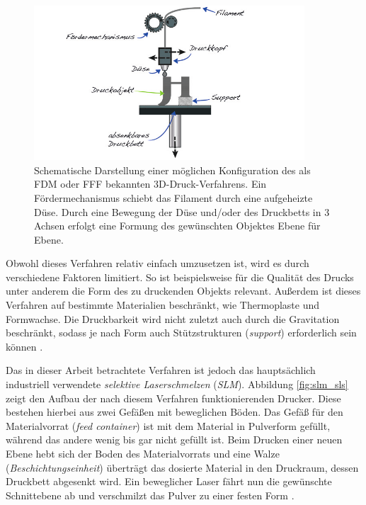 		\begin{figure}[!ht]
			\centering
			\includegraphics[width=0.9\textwidth]{chapter/main/img/fdm.png}
			\caption[Schematische Darstellung des FDM-/FFF-Verfahrens]{Schematische Darstellung
			einer möglichen Konfiguration des als FDM oder FFF bekannten 3D-Druck-Verfahrens. Ein
			Fördermechanismus schiebt das Filament durch eine aufgeheizte Düse. Durch eine
			Bewegung der Düse und/oder des Druckbetts in 3 Achsen erfolgt eine Formung
			des gewünschten Objektes Ebene für Ebene. \cite{horsch20143d}}
			\label{fig:fdm}
		\end{figure}

		Obwohl dieses Verfahren relativ einfach umzusetzen ist, wird es durch verschiedene
		Faktoren limitiert. So ist beispielsweise für die Qualität des Drucks unter anderem die
		Form des zu druckenden Objekts relevant. Außerdem ist dieses Verfahren auf bestimmte
		Materialien beschränkt, wie Thermoplaste und Formwachse. Die Druckbarkeit wird nicht
		zuletzt auch durch die Gravitation beschränkt, sodass je nach Form auch Stützstrukturen
		(\emph{support}) erforderlich sein können \cite{wikipedia2021fused}.

		Das in dieser Arbeit betrachtete Verfahren ist jedoch das hauptsächlich industriell
		verwendete \emph{selektive Laserschmelzen} (\emph{SLM}). Abbildung \ref{fig:slm_sls}
		zeigt den Aufbau der nach diesem Verfahren funktionierenden Drucker. Diese bestehen
		hierbei aus zwei Gefäßen mit beweglichen Böden. Das Gefäß für den Materialvorrat
		(\emph{feed container}) ist mit dem Material in Pulverform gefüllt, während das andere
		wenig bis gar nicht gefüllt ist. Beim Drucken einer neuen Ebene hebt sich der Boden des
		Materialvorrats und eine Walze (\emph{Beschichtungseinheit}) überträgt das dosierte
		Material in den Druckraum, dessen Druckbett abgesenkt wird. Ein beweglicher Laser fährt
		nun die gewünschte Schnittebene ab und verschmilzt das Pulver zu einer festen Form
		\cite{horsch20143d}.

